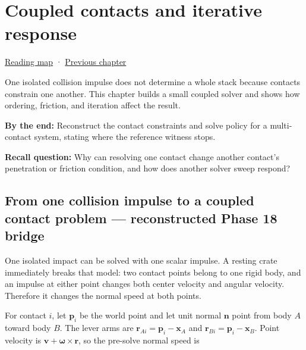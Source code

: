 \chapter{Coupled contacts and iterative response}\label{06-engine-ii-ch040-coupled-contacts-and-iterative-response}\hypertarget{06-engine-ii-ch040}{}\label{stagechapter:06-engine-ii-ch040}

\hypertarget{06-engine-ii-ch040-coupled-contacts-and-iterative-response}{}

\hyperref[volume-reading-map]{Reading map} · \hyperref[06-engine-ii-ch039-composable-timesteps-and-stable-simulation-policy]{Previous chapter}

One isolated collision impulse does not determine a whole stack because contacts constrain one another. This chapter builds a small coupled solver and shows how ordering, friction, and iteration affect the result.

\textbf{By the end:} Reconstruct the contact constraints and solve policy for a multi-contact system, stating where the reference witness stops.

\textbf{Recall question:} Why can resolving one contact change another contact's penetration or friction condition, and how does another solver sweep respond?

\section{From one collision impulse to a coupled contact problem --- reconstructed Phase 18 bridge}\label{06-engine-ii-ch040-from-one-collision-impulse-to-a-coupled-contact-problem-reconstructed-phase-18-bridge}

\hypertarget{06-engine-ii-ch040-from-one-collision-impulse-to-a-coupled-contact-problem-reconstructed-phase-18-bridge}{}

One isolated impact can be solved with one scalar impulse. A resting crate immediately breaks that model: two contact points belong to one rigid body, and an impulse at either point changes both center velocity and angular velocity. Therefore it changes the normal speed at both points.

For contact \(i\), let \(\mathbf p_i\) be the world point and let unit normal \(\mathbf n\) point from body \(A\) toward body \(B\). The lever arms are \(\mathbf r_{Ai}=\mathbf p_i-\mathbf x_A\) and \(\mathbf r_{Bi}=\mathbf p_i-\mathbf x_B\). Point velocity is \(\mathbf v+\boldsymbol\omega\times\mathbf r\), so the pre-solve normal speed is

